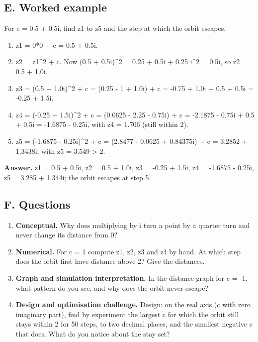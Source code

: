 \documentclass[11pt,a4paper]{article}
\begin{document}
\subsection*{E. Worked example}
For c = 0.5 + 0.5i, find z1 to z5 and the step at which the orbit escapes.
\begin{enumerate}[nosep]
\item z1 = 0*0 + c = 0.5 + 0.5i.
\item z2 = z1\textasciicircum{}2 + c. Now (0.5 + 0.5i)\textasciicircum{}2 = 0.25 + 0.5i + 0.25 i\textasciicircum{}2 = 0.5i, so z2 = 0.5 + 1.0i.
\item z3 = (0.5 + 1.0i)\textasciicircum{}2 + c = (0.25 - 1 + 1.0i) + c = -0.75 + 1.0i + 0.5 + 0.5i = -0.25 + 1.5i.
\item z4 = (-0.25 + 1.5i)\textasciicircum{}2 + c = (0.0625 - 2.25 - 0.75i) + c = -2.1875 - 0.75i + 0.5 + 0.5i = -1.6875 - 0.25i, with \textbar{}z4\textbar{} = 1.706 (still within 2).
\item z5 = (-1.6875 - 0.25i)\textasciicircum{}2 + c = (2.8477 - 0.0625 + 0.84375i) + c = 3.2852 + 1.3438i, with \textbar{}z5\textbar{} = 3.549 \textgreater{} 2.
\end{enumerate}
\textbf{Answer.} z1 = 0.5 + 0.5i, z2 = 0.5 + 1.0i, z3 = -0.25 + 1.5i, z4 = -1.6875 - 0.25i, z5 = 3.285 + 1.344i; the orbit escapes at step 5.

\subsection*{F. Questions}
\begin{enumerate}[nosep]
\item \textbf{Conceptual.} Why does multiplying by i turn a point by a quarter turn and never change its distance from 0?
\item \textbf{Numerical.} For c = 1 compute z1, z2, z3 and z4 by hand. At which step does the orbit first have distance above 2? Give the distances.
\item \textbf{Graph and simulation interpretation.} In the distance graph for c = -1, what pattern do you see, and why does the orbit never escape?
\item \textbf{Design and optimisation challenge.} Design: on the real axis (c with zero imaginary part), find by experiment the largest c for which the orbit still stays within 2 for 50 steps, to two decimal places, and the smallest negative c that does. What do you notice about the stay set?
\end{enumerate}
\end{document}
